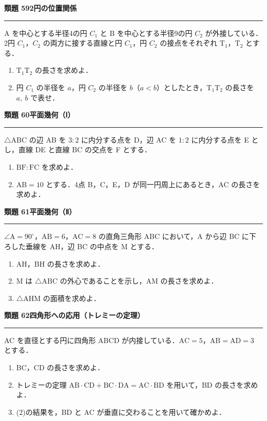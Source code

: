 \documentclass[a4paper,11pt]{ltjsarticle}
\newcommand{\mon}[2]{\Needspace{7\baselineskip}\vspace{10pt}%
  {\sffamily\bfseries 類題 #1\quad #2\par}\vspace{2pt}\hrule\vspace{4pt}}
\begin{document}
\mon{59}{2円の位置関係}
\begin{minipage}[t]{0.6\linewidth}
A を中心とする半径4の円 $C_1$ と B を中心とする半径9の円 $C_2$ が外接している．2円 $C_1$，$C_2$ の両方に接する直線と円 $C_1$，円 $C_2$ の接点をそれぞれ $\mathrm T_1$，$\mathrm T_2$ とする．
\begin{enumerate}
\item $\mathrm T_1\mathrm T_2$ の長さを求めよ．
\item 円 $C_1$ の半径を $a$，円 $C_2$ の半径を $b$（$a<b$）としたとき，$\mathrm T_1\mathrm T_2$ の長さを $a,\ b$ で表せ．
\end{enumerate}
\end{minipage}\hfill
\begin{minipage}[t]{0.37\linewidth}
\vspace{-4pt}
\end{minipage}

\mon{60}{平面幾何（Ⅰ）}
$\triangle\mathrm{ABC}$ の辺 AB を $3:2$ に内分する点を D，辺 AC を $1:2$ に内分する点を E とし，直線 DE と直線 BC の交点を F とする．
\begin{enumerate}
\item $\mathrm{BF}:\mathrm{FC}$ を求めよ．
\item $\mathrm{AB}=10$ とする．4点 B，C，E，D が同一円周上にあるとき，AC の長さを求めよ．
\end{enumerate}

\mon{61}{平面幾何（Ⅱ）}
$\angle\mathrm A=90^\circ$，$\mathrm{AB}=6$，$\mathrm{AC}=8$ の直角三角形 ABC において，A から辺 BC に下ろした垂線を AH，辺 BC の中点を M とする．
\begin{enumerate}
\item AH，BH の長さを求めよ．
\item M は $\triangle\mathrm{ABC}$ の外心であることを示し，AM の長さを求めよ．
\item $\triangle\mathrm{AHM}$ の面積を求めよ．
\end{enumerate}

\mon{62}{四角形への応用（トレミーの定理）}
AC を直径とする円に四角形 ABCD が内接している．$\mathrm{AC}=5$，$\mathrm{AB}=\mathrm{AD}=3$ とする．
\begin{enumerate}
\item BC，CD の長さを求めよ．
\item トレミーの定理 $\mathrm{AB}\cdot\mathrm{CD}+\mathrm{BC}\cdot\mathrm{DA}=\mathrm{AC}\cdot\mathrm{BD}$ を用いて，BD の長さを求めよ．
\item (2)の結果を，BD と AC が垂直に交わることを用いて確かめよ．
\end{enumerate}
\end{document}
